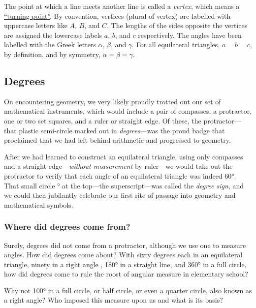 \documentclass[
  a4paper,
]{article}
\begin{document}
The point at which a line meets another line is called a \emph{vertex},
which means a
\href{https://www.etymonline.com/search?q=vertex}{``turning point''}. By
convention, vertices (plural of vertex) are labelled with uppercase
letters like \(A\), \(B\), and \(C\). The lengths of the sides opposite
the vertices are assigned the lowercase labels \(a\), \(b\), and \(c\)
respectively. The angles have been labelled with the Greek letters
\(\alpha\), \(\beta\), and \(\gamma\). For all equilateral triangles,
\(a = b = c\), by definition, and by symmetry,
\(\alpha = \beta = \gamma\).

\hypertarget{degrees}{%
\subsection{Degrees}\label{degrees}}

On encountering geometry, we very likely proudly trotted out our set of
mathematical instruments, which would include a pair of compasses, a
protractor, one or two set squares, and a ruler or straight edge. Of
these, the protractor---that plastic semi-circle marked out in
\emph{degrees}---was the proud badge that proclaimed that we had left
behind arithmetic and progressed to geometry.

After we had learned to construct an equilateral triangle, using only
compasses and a straight edge---\emph{without measurement} by ruler---we
would take out the protractor to verify that each angle of an
equilateral triangle was indeed 60°. That small circle ° at the
top---the superscript---was called the \emph{degree sign}, and we could
then jubilantly celebrate our first rite of passage into geometry and
mathematical symbols.

\hypertarget{where-did-degrees-come-from}{%
\subsubsection{Where did degrees come
from?}\label{where-did-degrees-come-from}}

Surely, degrees did not come from a protractor, although we use one to
measure angles. How did degrees come about? With sixty degrees each in
an equilateral triangle, ninety in a right angle , 180° in a straight
line, and 360° in a full circle, how did degrees come to rule the roost
of angular measure in elementary school?

Why not 100° in a full circle, or half circle, or even a quarter circle,
also known as a right angle? Who imposed this measure upon us and what
is its basis?
\end{document}

